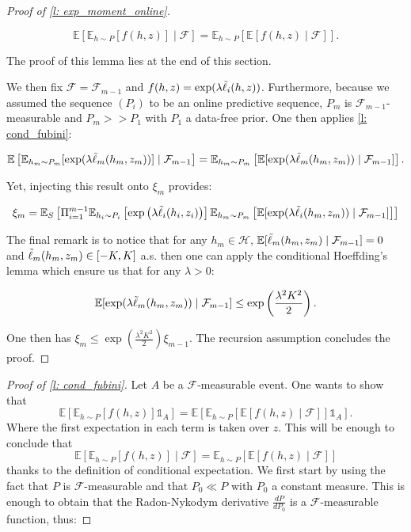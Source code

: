 \begin{noaddcontents}
\begin{proof}[Proof of \cref{l: exp_moment_online}]
\begin{lemma}
  \[ \mathbb{E}\left[\mathbb{E}_{h\sim P} [f(h,z)] \mid \mathcal{F} \right] =  \mathbb{E}_{h\sim P} \left[ \mathbb{E}[f(h,z)\mid \mathcal{F}] \right].    \]
\end{lemma}

\noindent The proof of this lemma lies at the end of this section.

\noindent We then fix $\mathcal{F}= \mathcal{F}_{m-1}$ and $f(h,z)= \exp(\lambda\Tilde{\ell}_i(h,z))$. Furthermore, because we assumed the sequence $(P_i)$ to be an online predictive sequence, $P_m$ is $\mathcal{F}_{m-1}$-measurable and $P_m>>P_1$ with $P_1$ a data-free prior. One then applies \cref{l: cond_fubini}:

\[ \mathbb{E}
\left[ \mathbb{E}_{h_m\sim P_m} [\exp(\lambda \Tilde{\ell}_m(h_m,z_m))] \mid \mathcal{F}_{m-1} \right] =  \mathbb{E}_{h_m\sim P_m} \left[ \mathbb{E}
[\exp(\lambda \Tilde{\ell}_m(h_m,z_m)) \mid \mathcal{F}_{m-1}] \right] . \]

\noindent Yet, injecting this result onto $\xi_m$ provides:

\begin{align*}
  \xi_m = \mathbb{E}_S\left[ \Pi_{i=1}^{m-1}\mathbb{E}_{h_i \sim P_i} \left[\exp\left(\lambda  \Tilde{\ell}_i(h_i,z_i)\right)\right] \mathbb{E}_{h_m\sim P_m} \left[ \mathbb{E}
  [\exp(\lambda \Tilde{\ell}_i(h_m,z_m)) \mid \mathcal{F}_{m-1}] \right] \right]
\end{align*}

The final remark is to notice that for any $h_m\in\mathcal{H}$, $\mathbb{E}[\Tilde{\ell}_m(h_m,z_m)\mid \mathcal{F}_{m-1}] = 0$ and $\Tilde{\ell}_m(h_m,z_m)\in [-K,K]$ a.s. then one can apply the conditional Hoeffding's lemma which ensure us that for any $\lambda>0$:

\[ \mathbb{E}
[\exp(\lambda \Tilde{\ell}_m(h_m,z_m)) \mid \mathcal{F}_{m-1}] \leq \exp\left( \frac{\lambda^2K^2}{2}   \right). \]

One then has $\xi_m \leq \exp\left( \frac{\lambda^2K^2}{2}   \right) \xi_{m-1}$. The recursion assumption concludes the proof.


\end{proof}



\begin{proof}[Proof of \cref{l: cond_fubini}]
 Let $A$ be a $\mathcal{F}$-measurable event. One wants to show that
  \[ \mathbb{E}\left[\mathbb{E}_{h\sim P} [f(h,z)]\mathds{1}_A \right] = \mathbb{E}\left[\mathbb{E}_{h\sim P} \left[ \mathbb{E}[f(h,z)\mid \mathcal{F}] \right] \mathds{1}_A \right]. \]
  \noindent Where the first expectation in each term is taken over $z$. This will be enough to conclude that
  \[ \mathbb{E}\left[\mathbb{E}_{h\sim P} [f(h,z)]\mid \mathcal{F} \right] = \mathbb{E}_{h\sim P} \left[ \mathbb{E}[f(h,z)\mid \mathcal{F}] \right]   \]
  \noindent thanks to the definition of conditional expectation. We first start by using the fact that $P$ is $\mathcal{F}$-measurable and that $P_0 \ll P$ with $P_0$ a constant measure. This is enough to obtain that the Radon-Nykodym derivative $\frac{dP}{dP_0}$ is a $\mathcal{F}$-measurable function, thus:


\end{proof}
\end{noaddcontents}
